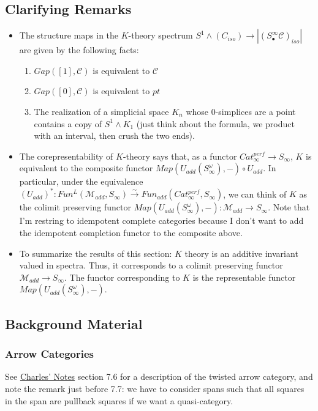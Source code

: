 \documentclass[letterpaper]{article}
\theoremstyle{definition}
\newcommand{\mc}{\mathcal}
\begin{document}
\subsection{Clarifying Remarks}
\begin{itemize}
\item The structure maps in the $K$-theory spectrum $S^1 \wedge
  (C_{iso}) \rightarrow |(S_{\bullet}^\infty \mc C)_{iso}|$ are given
  by the following facts: 
\begin{enumerate}
\item$Gap([1],\mc C)$ is equivalent to $\mc C$
\item $Gap([0], \mc C)$ is equivalent to $pt$
\item The realization of a simplicial space  $K_n$ whose 0-simplices are a
  point contains a copy of $S^1 \wedge K_1$ (just think about the
  formula, we product with an interval, then crush the two ends).
\end{enumerate}
\item The corepresentability of $K$-theory says that, as a functor
  $Cat_{\infty}^{perf} \rightarrow S_{\infty}$, $K$ is equivalent to
  the composite functor $Map(U_{add}(S_\infty^\omega), -) \circ U_{add}$. In
  particular, under the equivalence $(U_{add})^* : Fun^L(\mc
  M_{add},S_\infty) \xrightarrow{\sim} Fun_{add}(Cat_\infty^{perf},S_\infty)$,
  we can think of $K$ as the colimit preserving functor
  $Map(U_{add}(S_\infty^\omega),-) : \mc M_{add} \rightarrow
  S_\infty$. Note that I'm restring to idempotent complete categories
  because I don't want to add the idempotent completion functor to the
  composite above. 
\item To summarize the results of this section: $K$ theory is an
  additive invariant valued in spectra. Thus, it corresponds to a
  colimit preserving functor $\mc M_{add} \rightarrow S_{\infty}$. The
  functor corresponding to $K$ is the representable functor $Map(U_{add}(S^\omega_\infty),-)$.
\end{itemize}
\subsection{Background Material}

\subsubsection{Arrow Categories}

See \href{References/quasicats.pdf}{Charles' Notes} section 7.6 for a
description of the twisted arrow category, and note the remark just
before 7.7: we have to consider spans such that all squares in the
span are pullback squares if we want a quasi-category.   
\end{document}
